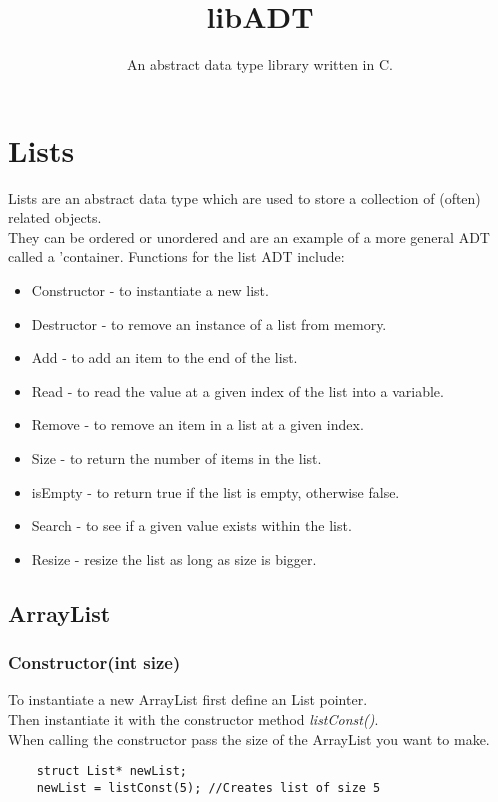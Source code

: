\documentclass{article}
\title{libADT}
\subtitle{An abstract data type library written in C.}
\author{}
\date{}
\begin{document}
\lstset{language=C}

\maketitle
\newpage{}
\section{Lists}
Lists are an abstract data type which are used to store a collection of (often) related objects.\\
They can be ordered or unordered and are an example of a more general ADT called a 'container.
Functions for the list ADT include:
\begin{itemize}
\item {Constructor} - to instantiate a new list.
\item {Destructor} - to remove an instance of a list from memory.
\item {Add} - to add an item to the end of the list.
\item {Read} - to read the value at a given index of the list into a variable. 
\item {Remove} - to remove an item in a list at a given index.
\item {Size} - to return the number of items in the list.
\item {isEmpty} - to return true if the list is empty, otherwise false.
\item {Search} - to see if a given value exists within the list.
\item {Resize} - resize the list as long as size is bigger.
\end{itemize}

\subsection*{ArrayList}
\subsubsection*{Constructor(int size)}
To instantiate a new ArrayList first define an List pointer.\\
Then instantiate it with the constructor method \emph{listConst()}. \\
When calling the constructor pass the size of the ArrayList you want to make.
\begin{lstlisting}
    struct List* newList;
    newList = listConst(5); //Creates list of size 5
\end{lstlisting}
\end{document}
